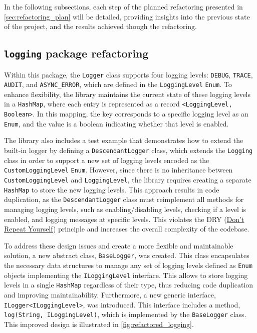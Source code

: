 In the following subsections, each step of the planned refactoring presented in \autoref{sec:refactoring_plan} will be detailed, providing insights into the previous state of the project, and the results achieved though the refactoring.

\subsection{\texttt{logging} package refactoring}

Within this package, the \texttt{Logger} class supports four logging levels: \texttt{DEBUG}, \texttt{TRACE}, \texttt{AUDIT}, and \texttt{ASYNC\_ERROR}, which are defined in the \texttt{LoggingLevel} \texttt{Enum}. To enhance flexibility, the library maintains the current state of these logging levels in a \texttt{HashMap}, where each entry is represented as a record \texttt{<LoggingLevel, Boolean>}. In this mapping, the key corresponds to a specific logging level as an \texttt{Enum}, and the value is a boolean indicating whether that level is enabled.

The library also includes a test example that demonstrates how to extend the built-in logger by defining a \texttt{DescendantLogger} class, which extends the \texttt{Logging} class in order to support a new set of logging levels encoded as the \texttt{CustomLoggingLevel} \texttt{Enum}. However, since there is no inheritance between \texttt{CustomLoggingLevel} and \texttt{LoggingLevel}, the library requires creating a separate \texttt{HashMap} to store the new logging levels. This approach results in code duplication, as the \texttt{DescendantLogger} class must reimplement all methods for managing logging levels, such as enabling/disabling levels, checking if a level is enabled, and logging messages at specific levels. This violates the DRY (\href{https://en.wikipedia.org/wiki/Don%27t_repeat_yourself}{Don't Repeat Yourself}) principle and increases the overall complexity of the codebase.

To address these design issues and create a more flexible and maintainable solution, a new abstract class, \texttt{BaseLogger}, was created. This class encapsulates the necessary data structures to manage any set of logging levels defined as \texttt{Enum} objects implementing the \texttt{ILoggingLevel} interface. This allows to store logging levels in a single \texttt{HashMap} regardless of their type, thus reducing code duplication and improving maintainability. Furthermore, a new generic interface, \texttt{ILogger<ILoggingLevel>}, was introduced. This interface includes a method, \texttt{log(String, ILoggingLevel)}, which is implemented by the \texttt{BaseLogger} class. This improved design is illustrated in \autoref{fig:refactored_logging}.

